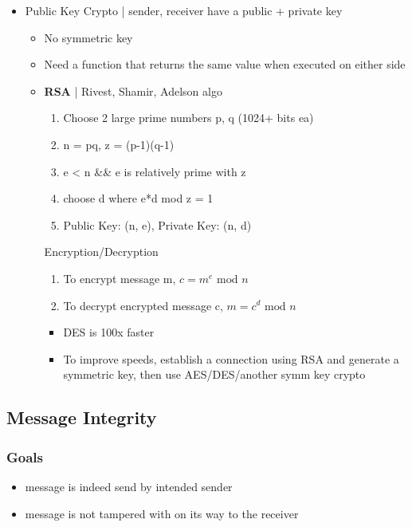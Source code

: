 \documentclass{article}
\begin{document}
\begin{itemize}
	\item Public Key Crypto | sender, receiver have a public + private key
	\begin{itemize}
		\item No symmetric key
		\item Need a function that returns the same value when executed on either side
		\item \textbf{RSA} | Rivest, Shamir, Adelson algo
		\begin{enumerate}
			\item Choose 2 large prime numbers p, q (1024+ bits ea)
			\item n = pq, z = (p-1)(q-1)
			\item e < n \&\& e is relatively prime with z
			\item choose d where e*d mod z = 1
			\item Public Key: (n, e), Private Key: (n, d)
		\end{enumerate}
		Encryption/Decryption
		\begin{enumerate}
			\item To encrypt message m, $c = m^e \text{ mod } n$
			\item To decrypt encrypted message c, $m = c^d \text{ mod } n$
		\end{enumerate}
		\begin{itemize}
			\item DES is 100x faster
			\item To improve speeds, establish a connection using RSA and generate a symmetric key, then use AES/DES/another symm key crypto
		\end{itemize}
	\end{itemize}
\end{itemize}

\subsection{Message Integrity}

\subsubsection*{Goals}

\begin{itemize}
	\item message is indeed send by intended sender
	\item message is not tampered with on its way to the receiver
\end{itemize}
\end{document}
